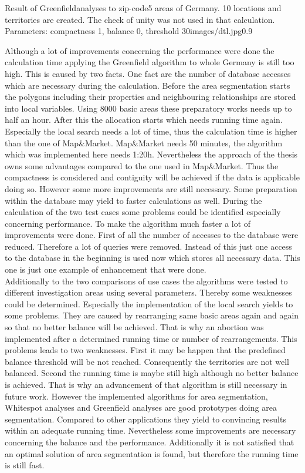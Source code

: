 \begin{figurevarSize}{Result of Greenfieldanalyses to zip-code5 areas of Germany. 10 locations and territories are created. The check of unity was not used in that calculation. Parameters: compactness 1, balance 0, threshold 30}{images/dtl.jpg}{0.9}\end{figurevarSize}

Although a lot of improvements concerning the performance were done the calculation time applying the Greenfield algorithm to whole Germany is still too high. This is caused by two facts. One fact are the number of database accesses which are necessary during the calculation. Before the area segmentation starts the polygons including their properties and neighbouring relationships are stored into local variables. Using 8000 basic areas these preparatory works needs up to half an hour. After this the allocation starts which needs running time again. Especially the local search needs a lot of time, thus the calculation time is higher than the one of Map\&Market. Map\&Market needs 50 minutes, the algorithm which was implemented here needs 1:20h. Nevertheless the approach of the thesis owns some advantages compared to the one used in Map\&Market. Thus the compactness is considered and contiguity will be achieved if the data is applicable doing so. However some more improvements are still necessary. Some preparation within the database may yield to faster calculations as well. During the calculation of the two test cases some problems could be identified especially concerning performance. To make the algorithm much faster a lot of improvements were done. First of all the number of accesses to the database were reduced. Therefore a lot of queries were removed. Instead of this just one access to the database in the beginning is used now which stores all necessary data. This one is just one example of enhancement that were done. \\
Additionally to the two comparisons of use cases the algorithms were tested to different investigation areas using several parameters. Thereby some weaknesses could be determined. Especially the implementation of the local search yields to some problems. They are caused by rearranging same basic areas again and again so that no better balance will be achieved. That is why an abortion was implemented after a determined running time or number of rearrangements. This problems leads to two weaknesses. First it may be happen that the predefined balance threshold will be not reached. Consequently the territories are not well balanced. Second the running time is maybe still high although no better balance is achieved. That is why an advancement of that algorithm is still necessary in future work. However the implemented algorithms for area segmentation, Whitespot analyses and Greenfield analyses are good prototypes doing area segmentation. Compared to other applications they yield to convincing results within an adequate running time. Nevertheless some improvements are necessary concerning the balance and the performance. Additionally it is not satisfied that an optimal solution of area segmentation is found, but therefore the running time is still fast. 

